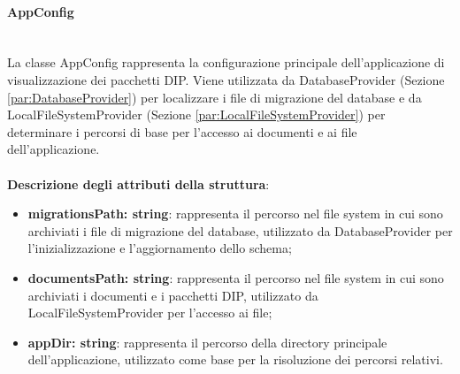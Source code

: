\documentclass[a4paper,12pt]{article}
\begin{document}
{{{                \paragraph{AppConfig}\label{par:AppConfig}\mbox{}\\
                La classe AppConfig rappresenta la configurazione principale dell'applicazione di visualizzazione dei pacchetti DIP. Viene utilizzata da DatabaseProvider (Sezione \ref{par:DatabaseProvider}) per localizzare i file di migrazione del database e da LocalFileSystemProvider (Sezione \ref{par:LocalFileSystemProvider}) per determinare i percorsi di base per l'accesso ai documenti e ai file dell'applicazione.\\
                \\
                \textbf{Descrizione degli attributi della struttura}:
                \begin{itemize}
                    \item \textbf{migrationsPath: string}: rappresenta il percorso nel file system in cui sono archiviati i file di migrazione del database, utilizzato da DatabaseProvider per l'inizializzazione e l'aggiornamento dello schema;
                    \item \textbf{documentsPath: string}: rappresenta il percorso nel file system in cui sono archiviati i documenti e i pacchetti DIP, utilizzato da LocalFileSystemProvider per l'accesso ai file;
                    \item \textbf{appDir: string}: rappresenta il percorso della directory principale dell'applicazione, utilizzato come base per la risoluzione dei percorsi relativi.
                \end{itemize}
}}}
\end{document}
